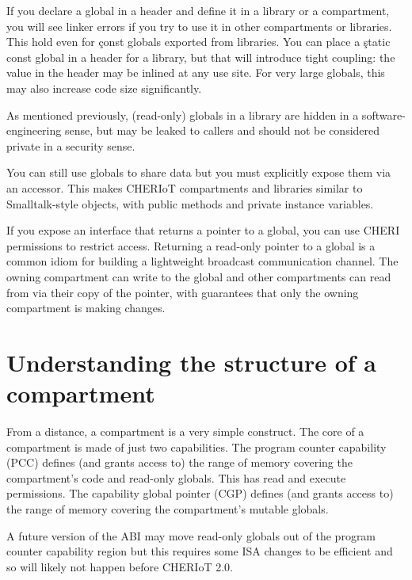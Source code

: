 If you declare a global in a header and define it in a library or a compartment, you will see linker errors if you try to use it in other compartments or libraries.
This hold even for \c{const} globals exported from libraries.
You can place a \c{static const} global in a header for a library, but that will introduce tight coupling: the value in the header may be inlined at any use site.
For very large globals, this may also increase code size significantly.

\begin{note}
As mentioned previously, (read-only) globals in a library are hidden in a software-engineering sense, but may be leaked to callers and should not be considered private in a security sense.
\end{note}

You can still use globals to share data but you must explicitly expose them via an accessor.
This makes CHERIoT compartments and libraries similar to Smalltalk-style objects, with public methods and private instance variables.

If you expose an interface that returns a pointer to a global, you can use CHERI permissions to restrict access.
Returning a read-only pointer to a global is a common idiom for building a lightweight broadcast communication channel.
The owning compartment can write to the global and other compartments can read from via their copy of the pointer, with guarantees that only the owning compartment is making changes.

\section{Understanding the structure of a compartment}

From a distance, a compartment is a very simple construct.
The core of a compartment is made of just two capabilities.
The program counter capability (PCC) defines (and grants access to) the range of memory covering the compartment's code and read-only globals.
This has read and execute permissions.
The capability global pointer (CGP) defines (and grants access to) the range of memory covering the compartment's mutable globals.

\begin{note}
A future version of the ABI may move read-only globals out of the program counter capability region but this requires some ISA changes to be efficient and so will likely not happen before CHERIoT 2.0.
\end{note}

